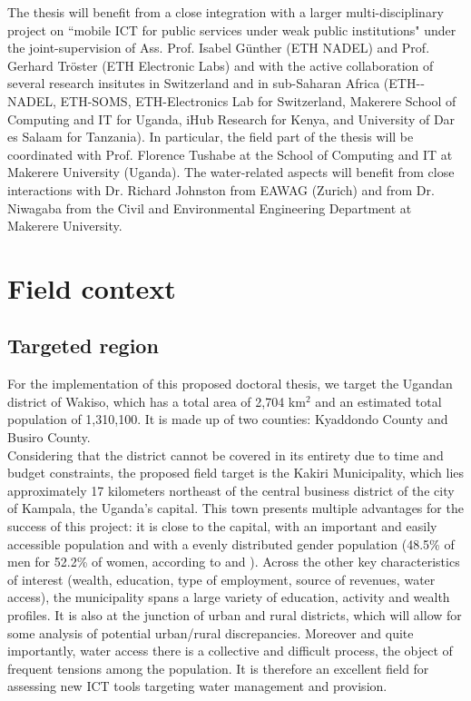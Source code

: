 \documentclass[11pt]{article}
\begin{document}
The thesis will benefit from a close integration with a larger multi-disciplinary project on ``mobile ICT for public services under weak public institutions" under the joint-supervision of Ass. Prof. Isabel Günther (ETH NADEL) and Prof. Gerhard Tr\"{o}ster (ETH Electronic Labs) and with the active collaboration of several research insitutes in Switzerland and in sub-Saharan Africa (ETH-­NADEL, ETH-­SOMS, ETH-­Electronics Lab for Switzerland, Makerere School of Computing and IT for Uganda, iHub Research for Kenya, and University of Dar es Salaam for Tanzania). In particular, the field part of the thesis will be coordinated with Prof. Florence Tushabe at the School of Computing and IT at Makerere University (Uganda). The water-related aspects will benefit from close interactions with Dr. Richard Johnston from EAWAG (Zurich) and from Dr. Niwagaba from the Civil and Environmental Engineering Department at Makerere University.  

\section{Field context}
\subsection{Targeted region}
For the implementation of this proposed doctoral thesis, we target the Ugandan district of Wakiso, which has a total area of 2,704 km$^{2}$ and an estimated total population of 1,310,100. It is made up of two counties: Kyaddondo County and Busiro County. 
\\
Considering that the district cannot be covered in its entirety due to time and budget constraints, the proposed field target is the Kakiri Municipality, which lies approximately 17 kilometers northeast of the central business district of the city of Kampala, the Uganda's capital. This town presents multiple advantages for the success of this project: it is close to the capital, with an important and easily accessible population and with a evenly distributed gender population (48.5\% of men for 52.2\% of women, according to \citep{population2010} and \citep{population02}). Across the other key characteristics of interest (wealth, education, type of employment, source of revenues, water access), the municipality spans a large variety of education, activity and wealth profiles. It is also at the junction of urban and rural districts, which will allow for some analysis of potential urban/rural discrepancies. Moreover and quite importantly, water access there is a collective and difficult process, the object of frequent tensions among the population. It is therefore an excellent field for assessing new ICT tools targeting water management and provision.
\end{document}
